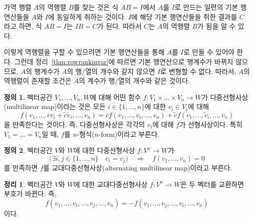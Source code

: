 \documentclass[unfonts,oneside,a4paper]{oblivoir}
\theoremstyle{definition}
\newtheorem{definition}{정의}[section]
\theoremstyle{theorem}
\newtheorem{theorem}{정리}[section]
\theoremstyle{theorem}
\theoremstyle{remark}
\theoremstyle{remark}
\theoremstyle{remark}
\theoremstyle{remark}
\renewcommand{\vec}[1]{\bm{\mathit{#1}}}
\begin{document}
가역 행렬 $A$의 역행렬 $B$를 찾는 것은 식 $AB = I$에서 $A$를 $I$로 만드는 일련의 기본 행연산들을 $A$와 $I$에 동일하게 취하는 것이다.
$I$에 해당 기본 행연산들을 취한 결과를 $C$라고 하면, 식 $AB = I$는 $IB = C$가 된다.
따라서 $C$는 $A$의 역행렬 $B$가 됨을 알 수 있다.

이렇게 역행렬을 구할 수 있으려면 기본 행연산들을 통해 $A$를 $I$로 만들 수 있어야 한다.
그런데 정리~\ref{thm:rowrankinvar}에 따르면 기본 행연산으로 행계수가 바뀌지 않으므로, $A$의 행계수가 $A$의 행/열의 개수와 같지 않으면 $I$로 변형할 수 없다.
따라서, $A$의 역행렬이 존재할 조건은 $A$의 계수가 행/열의 개수와 같은 것이다.

\begin{definition} \label{def:multilin}
    벡터공간 $V_1, \dots, V_n, W$에 대해 어떤 함수 $f: V_1 \times \dots \times V_n \rightarrow W$가 다중선형사상(multilinear map)이라는 것은 모든 $i \in \{1, \dots, n\}$에 대한 $\vec v_i \in V_i$에 대해
    \begin{equation*}
        f(\vec v_1, \dots, c \vec v_i + \tilde c \tilde{\vec v}_i, \dots, \vec v_n) = c f(\vec v_1, \dots, \vec v_i, \dots, \vec v_n) + \tilde c f(\vec v_1, \dots, \tilde{\vec v}_i, \dots, \vec v_n)
    \end{equation*}
    을 만족한다는 것이다.
    즉, 다중선형사상은 각각의 $\vec v_i$에 대해 $f$가 선형사상이다.
    특히 $V_1 = \dots = V_n$일 때, $f$를 $n$-형식($n$-form)이라고 부른다.
\end{definition}

\begin{definition} \label{def:alternating_multilin}
    벡터공간 $V$와 $W$에 대한 다중선형사상 $f: V^n \rightarrow W$가
    \begin{equation*}
        \bigl(\exists i, j \in \{1, \dots, n\} \quad \vec v_i = \vec v_j\bigr) \quad \Rightarrow \quad f(\vec v_1, \dots, \vec v_n) = 0
    \end{equation*}
    를 만족하면 $f$를 교대다중선형사상(alternating multilinear map)이라고 부른다.
\end{definition}

\begin{theorem} \label{thm:skew_sym}
    벡터공간 $V$와 $W$에 대한 교대다중선형사상 $f: V^n \rightarrow W$은 두 벡터를 교환하면 부호가 바뀐다.
    즉,
    \begin{equation*}
        f(\vec v_1, \dots, \vec v_i, \dots, \vec v_j, \dots, \vec v_n) = -f(\vec v_1, \dots, \vec v_j, \dots, \vec v_i, \dots, \vec v_n)
    \end{equation*}
    이다.
\end{theorem}
\end{document}
